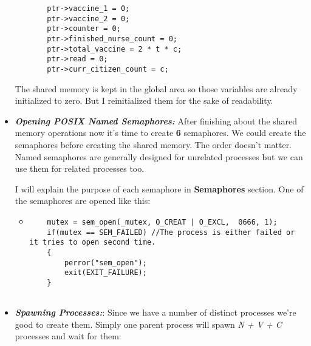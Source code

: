 \documentclass{article}
\begin{document}
\begin{itemize}
\begin{itemize}
\begin{lstlisting}
    ptr->vaccine_1 = 0;
    ptr->vaccine_2 = 0;
    ptr->counter = 0;
    ptr->finished_nurse_count = 0;
    ptr->total_vaccine = 2 * t * c;
    ptr->read = 0;
    ptr->curr_citizen_count = c;
    \end{lstlisting}
\end{itemize}
The shared memory is kept in the global area so those variables are already initialized to zero. But I reinitialized them for the sake of readability.
    
\item \textbf{\textit{Opening POSIX Named Semaphores:}} After finishing about the shared memory operations now it's time to create \textbf{6} semaphores. We could create the semaphores before creating the shared memory. The order doesn't matter. Named semaphores are generally designed for unrelated processes but we can use them for related processes too.

\quad I will explain the purpose of each semaphore in \textbf{Semaphores} section. One of the semaphores are opened like this:
\begin{itemize}
  \item 
    \begin{lstlisting}
    mutex = sem_open(_mutex, O_CREAT | O_EXCL,  0666, 1);
    if(mutex == SEM_FAILED) //The process is either failed or it tries to open second time.
    {   
        perror("sem_open");
        exit(EXIT_FAILURE);
    }


    \end{lstlisting}
\end{itemize}
\newpage
\item \textbf{\textit{Spawning Processes:}}:
Since we have a number of distinct processes we're good to create them. Simply one parent process will spawn \textit{N + V + C} processes and wait for them:


\end{itemize}
\end{document}
